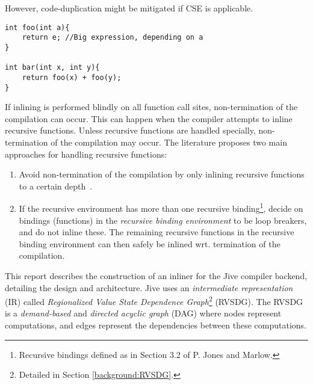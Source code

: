 However, code-duplication might be mitigated if CSE is applicable.

\begin{centering}
	\noindent\begin{minipage}{\textwidth}
		\begin{CenteredBox}
		\begin{lstlisting}[style=global_customcpp]
int foo(int a){
	return e; //Big expression, depending on a
}

int bar(int x, int y){
	return foo(x) + foo(y);
}
		\end{lstlisting}
		\end{CenteredBox}
	\end{minipage}
	\label{lst:code-dup}
\end{centering}

If inlining is performed blindly on all function call sites, non-termination of
the compilation can occur. This can happen when the compiler attempts to inline
recursive functions. Unless recursive functions are handled specially,
non-termination of the compilation may occur. The literature proposes two main
approaches for handling recursive functions:

\begin{enumerate}

	\item Avoid non-termination of the compilation by only inlining recursive
functions to a certain depth~\cite{GHCPaper}\cite{InlineWhenHowSerrano}.

	\item If the recursive environment has more than one recursive
binding\footnote{Recursive bindings defined as in Section 3.2 of P. Jones and
Marlow\cite{GHCPaper}.}, decide on bindings (functions) in the
\textit{recursive binding environment} to be loop breakers, and do not inline
these. The remaining recursive functions in the recursive binding environment
can then safely be inlined wrt. termination of the
compilation\cite{BasMscThesis}\cite{GHCPaper}.

\end{enumerate}

This report describes the construction of an inliner for the Jive compiler
backend, detailing the design and architecture. Jive uses an
\textit{intermediate representation} (IR) called \textit{Regionalized Value
State Dependence Graph}\footnote{Detailed in Section \ref{background:RVSDG}.}
(RVSDG). The RVSDG\cite{RVSDG:HiPEACpaper} is a \textit{demand-based} and
\textit{directed acyclic graph} (DAG) where nodes represent computations, and
edges represent the dependencies between these computations.

